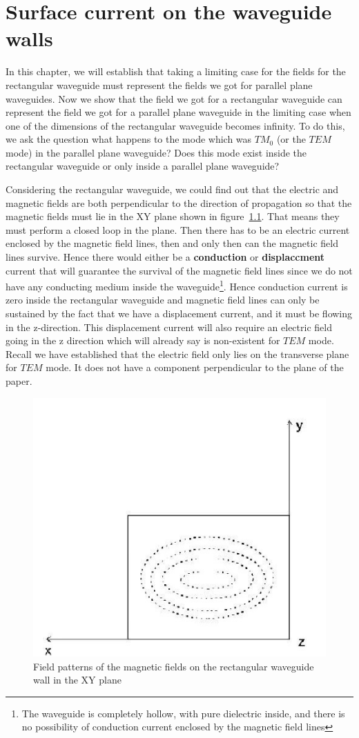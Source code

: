 \chapter{Surface current on the waveguide walls}
In this chapter, we will establish that taking a limiting case for the fields for the rectangular waveguide must represent the fields we got for parallel plane waveguides. Now we show that the field we got for a rectangular waveguide can represent the field we got for a parallel plane waveguide in the limiting case when one of the dimensions of the rectangular waveguide becomes infinity. To do this, we ask the question what happens to the mode which was $TM_0$ (or the $TEM$ mode) in the parallel plane waveguide? Does this mode exist inside the rectangular waveguide or only inside a parallel plane waveguide?

Considering the rectangular waveguide, we could find out that the electric and magnetic fields are both perpendicular to the direction of propagation so that the magnetic fields must lie in the XY plane shown in figure~\ref{fig:group4001}. That means they must perform a closed loop in the plane. Then there has to be an electric current enclosed by the magnetic field lines, then and only then can the magnetic field lines survive. Hence there would either be a \textbf{conduction} or \textbf{displaccment} current that will guarantee the survival of the magnetic field lines since we do not have any conducting medium inside the waveguide\footnote{The waveguide is completely hollow, with pure dielectric inside, and there is no possibility of conduction current enclosed by the magnetic field lines}. Hence conduction current is zero inside the rectangular waveguide and magnetic field lines can only be sustained by the fact that we have a displacement current, and it must be flowing in the z-direction. This displacement current will also require an electric field going in the z direction which will already say is non-existent for $TEM$ mode. Recall we have established that the electric field only lies on the transverse plane for $TEM$ mode. It does not have a component perpendicular to the plane of the paper.
\begin{figure}[h]
\centering
\includegraphics[width=0.6\linewidth]{./graphics/group4001}
\caption{Field patterns of the magnetic fields on the rectangular waveguide wall in the XY plane}
\label{fig:group4001}
\end{figure}

